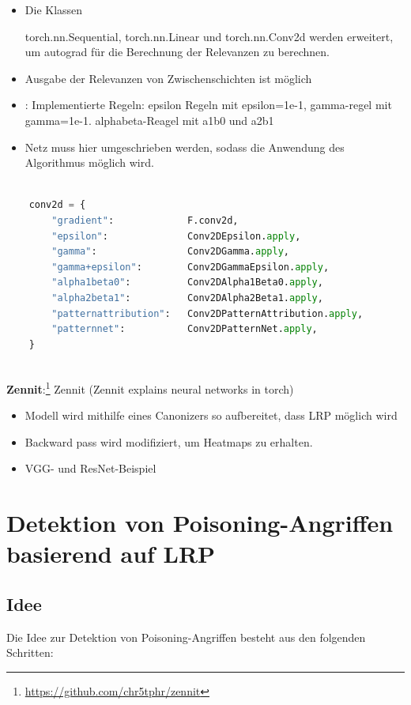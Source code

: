 \documentclass[twoside, 12pt,a4paper]{article}
\numberwithin{equation}{section}
\begin{document}
	\begin{itemize}
		\item Die Klassen
	
	torch.nn.Sequential, torch.nn.Linear und torch.nn.Conv2d werden erweitert, um autograd für die Berechnung der Relevanzen zu berechnen.
	
		\item Ausgabe der Relevanzen von Zwischenschichten ist möglich
		\item: Implementierte Regeln: epsilon Regeln mit epsilon=1e-1, gamma-regel mit gamma=1e-1. alphabeta-Reagel mit a1b0 und a2b1
		\item Netz muss hier umgeschrieben werden, sodass die Anwendung des Algorithmus möglich wird.
	\end{itemize}

\begin{lstlisting}[language=Python, caption=Implementierte Regeln fhvilshoj]

	conv2d = {
		"gradient":             F.conv2d,
		"epsilon":              Conv2DEpsilon.apply,
		"gamma":                Conv2DGamma.apply,
		"gamma+epsilon":        Conv2DGammaEpsilon.apply,
		"alpha1beta0":          Conv2DAlpha1Beta0.apply,
		"alpha2beta1":          Conv2DAlpha2Beta1.apply,
		"patternattribution":   Conv2DPatternAttribution.apply,
		"patternnet":           Conv2DPatternNet.apply,
	}
	
\end{lstlisting}
	
	\noindent \textbf{Zennit}:\footnote{\url{https://github.com/chr5tphr/zennit}}
	Zennit (Zennit explains neural networks in torch) 
	\begin{itemize}
		\item Modell wird mithilfe eines Canonizers so aufbereitet, dass LRP möglich wird
		\item Backward pass wird modifiziert, um Heatmaps zu erhalten.
		\item VGG- und ResNet-Beispiel
	\end{itemize}
	\section{Detektion von Poisoning-Angriffen basierend auf LRP} \label{chapter_algorithm}
	\subsection{Idee}
	Die Idee zur Detektion von Poisoning-Angriffen besteht aus den folgenden Schritten:
	
\end{document}
